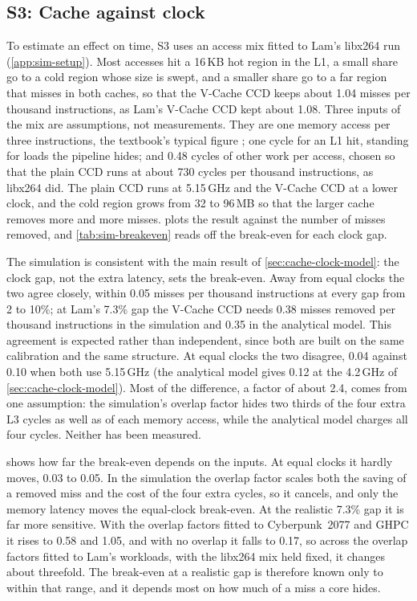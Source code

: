 \subsection{S3: Cache against clock}
\label{sec:sim-clock}
To estimate an effect on time, S3 uses an access mix fitted to Lam's libx264 run (\cref{app:sim-setup}). Most accesses hit a 16\,KB hot region in the L1, a small share go to a cold region whose size is swept, and a smaller share go to a far region that misses in both caches, so that the V-Cache CCD keeps about 1.04 misses per thousand instructions, as Lam's V-Cache CCD kept about 1.08. Three inputs of the mix are assumptions, not measurements. They are one memory access per three instructions, the textbook's typical figure \cite[sec.~11.1.1]{sarangi2025basic}; one cycle for an L1 hit, standing for loads the pipeline hides; and 0.48 cycles of other work per access, chosen so that the plain CCD runs at about 730 cycles per thousand instructions, as libx264 did. The plain CCD runs at 5.15\,GHz and the V-Cache CCD at a lower clock, and the cold region grows from 32 to 96\,MB so that the larger cache removes more and more misses.  plots the result against the number of misses removed, and \cref{tab:sim-breakeven} reads off the break-even for each clock gap.




The simulation is consistent with the main result of \cref{sec:cache-clock-model}: the clock gap, not the extra latency, sets the break-even. Away from equal clocks the two agree closely, within 0.05 misses per thousand instructions at every gap from 2 to 10\%; at Lam's 7.3\% gap the V-Cache CCD needs 0.38 misses removed per thousand instructions in the simulation and 0.35 in the analytical model. This agreement is expected rather than independent, since both are built on the same calibration and the same structure. At equal clocks the two disagree, 0.04 against 0.10 when both use 5.15\,GHz (the analytical model gives 0.12 at the 4.2\,GHz of \cref{sec:cache-clock-model}). Most of the difference, a factor of about 2.4, comes from one assumption: the simulation's overlap factor hides two thirds of the four extra L3 cycles as well as of each memory access, while the analytical model charges all four cycles. Neither has been measured.

 shows how far the break-even depends on the inputs. At equal clocks it hardly moves, 0.03 to 0.05. In the simulation the overlap factor scales both the saving of a removed miss and the cost of the four extra cycles, so it cancels, and only the memory latency moves the equal-clock break-even. At the realistic 7.3\% gap it is far more sensitive. With the overlap factors fitted to Cyberpunk~2077 and GHPC it rises to 0.58 and 1.05, and with no overlap it falls to 0.17, so across the overlap factors fitted to Lam's workloads, with the libx264 mix held fixed, it changes about threefold. The break-even at a realistic gap is therefore known only to within that range, and it depends most on how much of a miss a core hides.

